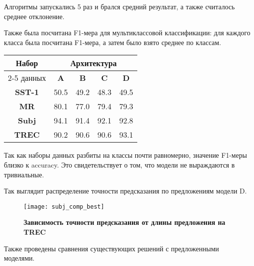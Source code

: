 Алгоритмы запускались 5 раз и брался средний результат, а также считалось среднее отклонение.

Также была посчитана F1-мера для мультиклассовой классификации: для каждого класса была посчитана F1-мера, а затем было взято среднее по классам.

\vspace{5mm}
\begin{minipage}{\linewidth}
 \label{tab:title} 
\begin{tabular}{|c|c|c|c|c|}
\hline
\multirow{2}{*}{Набор}   &             \multicolumn{4}{c|}{Архитектура} \\ \cline{2-5} 
     данных              & \textbf{A}  & \textbf{B} & \textbf{C} & \textbf{D} \\ \hline
\textbf{SST-1}           & 50.5        & 49.2       & 48.3       & 49.5     \\ \hline
\textbf{MR}              & 80.1        & 77.0       & 79.4       & 79.3     \\ \hline
\textbf{Subj}            & 94.1        & 91.4       & 92.1       & 92.8     \\ \hline
\textbf{TREC}            & 90.2        & 90.6       & 90.6       & 93.1     \\ \hline
\end{tabular}
\end{minipage}
\vspace{5mm}

Так как наборы данных разбиты на классы почти равномерно, значение F1-меры близко к accuracy.
Это свидетельствует о том, что модели не выраждаются в тривиальные.

Так выглядит распределение точности предсказания по предложениям модели D.

\begin{figure}[H]
\texttt{[image: subj\_comp\_best]}
\caption{\textbf{Зависимость точности предсказания от длины предложения на TREC}}
\label{fig:context_ex}
\end{figure}
\vspace{5mm}

Также проведены сравнения существующих решений с предложенными моделями.

\vspace{5mm}

